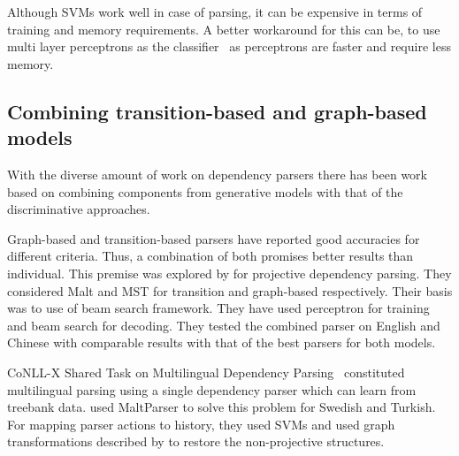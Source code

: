 Although SVMs work well in case of parsing, it can be expensive in terms of training and memory requirements. A better workaround for this can be, to use multi layer perceptrons as the classifier~\citep{attardi2009accurate} as perceptrons are faster and require less memory.  











\subsection{Combining transition-based and graph-based models}


With the diverse amount of work on dependency parsers there has been work based on combining components from generative models with that of the discriminative approaches.

Graph-based and transition-based parsers have reported good accuracies for different criteria. Thus, a combination of both promises better results than individual. This premise was explored by \cite{zhang2008tale} for projective dependency parsing. They considered Malt and MST for transition and graph-based respectively. Their basis was to use of beam search framework. They have used perceptron for training and beam search for decoding. They tested the combined parser on English and Chinese with comparable results with that of the best parsers for both models.



CoNLL-X Shared Task on Multilingual Dependency Parsing~\citep{Buchholz:2006:CST:1596276.1596305} constituted multilingual parsing using a single dependency parser which can learn from treebank data. \cite{Nivre:2006:LPD:1596276.1596318} used MaltParser to solve this problem for Swedish and Turkish. For mapping parser actions to history, they used SVMs and used graph transformations described by \cite{nivre2005pseudo} to restore the non-projective structures.

